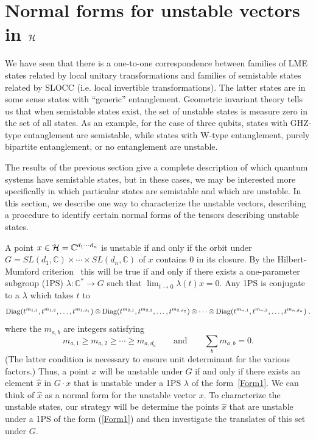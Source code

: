 \documentclass[12pt]{article}
\theoremstyle{definition}
\newcommand{\be}{\begin{equation}}
\newcommand{\ee}{\end{equation}}
\begin{document}
\section{Normal forms for unstable vectors in ${\cal H}$}

We have seen that there is a one-to-one correspondence between families of LME states related by local unitary transformations and families of semistable states related by SLOCC (i.e. local invertible transformations). The latter states are in some sense states with ``generic'' entanglement. Geometric invariant theory tells us that when semistable states exist, the set of unstable states is measure zero in the set of all states. As an example, for the case of three qubits, states with GHZ-type entanglement are semistable, while states with W-type entanglement, purely bipartite entanglement, or no entanglement are unstable.

The results of the previous section give a complete description of which quantum systems have semistable states, but in these cases, we may be interested more specifically in which particular states are semistable and which are unstable. In this section, we describe one way to characterize the unstable vectors, describing a procedure to identify certain normal forms of the tensors describing unstable states.

A point $x \in {\cal H} = \mathbb{C}^{d_1 \cdots d_n}$ is unstable if and only if the orbit under $G = SL(d_1, \mathbb{C}) \times \cdots \times SL(d_n, \mathbb{C})$ of $x$ contains 0 in its closure. By the Hilbert-Mumford criterion~\cite{mfk} this will be true if and only if there exists a one-parameter subgroup (1PS) $\lambda \colon \mathbb C^* \to G$ such that $\lim_{t \to 0} \lambda(t)x = 0$. Any 1PS is conjugate to a $\lambda$ which takes $t$ to 
\be
\label{Form1}
{\rm Diag} (t^{m_{1,1}}, t^{m_{1,2}}, \dots, t^{m_{1,d_1}}) \otimes {\rm Diag} (t^{m_{2,1}}, t^{m_{2,2}}, \dots, t^{m_{2,d_2}}) \otimes \cdots \otimes {\rm Diag} (t^{m_{n,1}}, t^{m_{n,2}}, \dots, t^{m_{n,d_n}})\; .
\ee
where the $m_{a,b}$ are integers satisfying
\be
\label{mconds}
m_{a,1} \ge m_{a,2} \ge \cdots \ge m_{a,d_a} \qquad \text{and} \qquad \sum_b m_{a,b} =0.
\ee
(The latter condition is necessary to ensure unit determinant for the various factors.)
Thus, a point $x$ will be unstable under $G$ if and only if there exists an element $\hat{x}$ in $G \cdot x$ that is unstable under a 1PS $\lambda$ of the form~\eqref{Form1}. We can think of $\hat{x}$ as a normal form for the unstable vector $x$.
To characterize the unstable states, our strategy will be determine the points $\hat{x}$ that are unstable under a 1PS of the form (\ref{Form1}) and then investigate the translates of this set under $G$.
\end{document}
